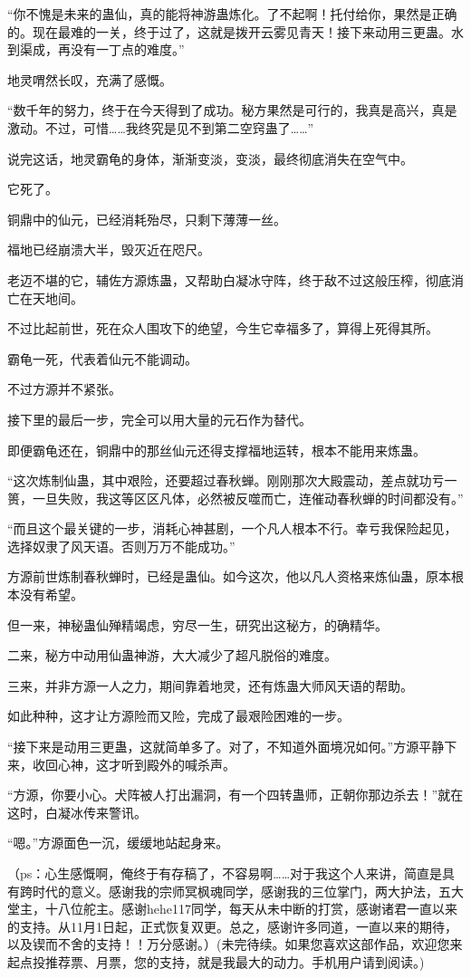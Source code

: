 \begin{this_body}
“你不愧是未来的蛊仙，真的能将神游蛊炼化。了不起啊！托付给你，果然是正确的。现在最难的一关，终于过了，这就是拨开云雾见青天！接下来动用三更蛊。水到渠成，再没有一丁点的难度。”

地灵喟然长叹，充满了感慨。

“数千年的努力，终于在今天得到了成功。秘方果然是可行的，我真是高兴，真是激动。不过，可惜……我终究是见不到第二空窍蛊了……”

说完这话，地灵霸龟的身体，渐渐变淡，变淡，最终彻底消失在空气中。

它死了。

铜鼎中的仙元，已经消耗殆尽，只剩下薄薄一丝。

福地已经崩溃大半，毁灭近在咫尺。

老迈不堪的它，辅佐方源炼蛊，又帮助白凝冰守阵，终于敌不过这般压榨，彻底消亡在天地间。

不过比起前世，死在众人围攻下的绝望，今生它幸福多了，算得上死得其所。

霸龟一死，代表着仙元不能调动。

不过方源并不紧张。

接下里的最后一步，完全可以用大量的元石作为替代。

即便霸龟还在，铜鼎中的那丝仙元还得支撑福地运转，根本不能用来炼蛊。

“这次炼制仙蛊，其中艰险，还要超过春秋蝉。刚刚那次大殿震动，差点就功亏一篑，一旦失败，我这等区区凡体，必然被反噬而亡，连催动春秋蝉的时间都没有。”

“而且这个最关键的一步，消耗心神甚剧，一个凡人根本不行。幸亏我保险起见，选择奴隶了风天语。否则万万不能成功。”

方源前世炼制春秋蝉时，已经是蛊仙。如今这次，他以凡人资格来炼仙蛊，原本根本没有希望。

但一来，神秘蛊仙殚精竭虑，穷尽一生，研究出这秘方，的确精华。

二来，秘方中动用仙蛊神游，大大减少了超凡脱俗的难度。

三来，并非方源一人之力，期间靠着地灵，还有炼蛊大师风天语的帮助。

如此种种，这才让方源险而又险，完成了最艰险困难的一步。

“接下来是动用三更蛊，这就简单多了。对了，不知道外面境况如何。”方源平静下来，收回心神，这才听到殿外的喊杀声。

“方源，你要小心。犬阵被人打出漏洞，有一个四转蛊师，正朝你那边杀去！”就在这时，白凝冰传来警讯。

“嗯。”方源面色一沉，缓缓地站起身来。

（ps：心生感慨啊，俺终于有存稿了，不容易啊……对于我这个人来讲，简直是具有跨时代的意义。感谢我的宗师冥枫魂同学，感谢我的三位掌门，两大护法，五大堂主，十八位舵主。感谢hehe117同学，每天从未中断的打赏，感谢诸君一直以来的支持。从11月1日起，正式恢复双更。总之，感谢许多同道，一直以来的期待，以及锲而不舍的支持！！万分感谢。）(未完待续。如果您喜欢这部作品，欢迎您来起点投推荐票、月票，您的支持，就是我最大的动力。手机用户请到阅读。)

\end{this_body}

